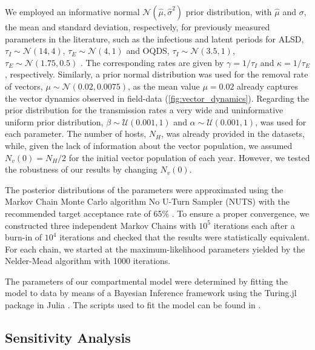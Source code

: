 We employed an informative normal $\mathcal{N}(\hat{\mu},\hat{\sigma}^2)$
prior distribution, with $\hat{\mu}$ and
$\sigma$, the mean and standard deviation, respectively, for previously
measured parameters in the literature, such as the infectious and latent
periods for ALSD, $\tau_I\sim\mathcal{N}(14, 4)$, $\tau_E\sim\mathcal{N}(4, 1)$
\cite{teviotdale2003almond, Moralejo2020} and OQDS,
$\tau_I\sim\mathcal{N}(3.5, 1)$, $\tau_E\sim\mathcal{N}(1.75, 0.5)$
\cite{Fierro2019}. The corresponding rates are given by $\gamma=1/\tau_I$ and
$\kappa=1/\tau_E$, respectively. Similarly, a prior normal distribution was
used for the removal rate of vectors, $\mu\sim\mathcal{N}(0.02, 0.0075)$, as
the mean value $\mu=0.02$ already captures the vector dynamics observed in
field-data (\cref{fig:vector_dynamics}). Regarding the prior distribution for
the transmission rates a very wide and uninformative uniform prior
distribution, $\beta\sim \mathcal{U}(0.001, 1)$ and
$\alpha\sim\mathcal{U}(0.001, 1)$, was used for each parameter. The number of
hosts, $N_H$, was already provided in the datasets, while, given the lack of
information about the vector population, we assumed $N_v(0)=N_H/2$ for the
initial vector population of each year. However, we tested the robustness of
our results by changing $N_v(0)$.

The posterior distributions of the parameters were approximated using the
Markov Chain Monte Carlo algorithm No U-Turn Sampler (NUTS) with the
recommended target acceptance rate of 65\% \cite{Homan2014}. To ensure a
proper convergence, we constructed three independent Markov Chains with $10^5$
iterations each after a burn-in of $10^4$ iterations and checked that the
results were statistically equivalent. For each chain, we started at the
maximum-likelihood parameters yielded by the Nelder-Mead algorithm with 1000
iterations.

The parameters of our compartmental model were determined by fitting the
model to data by means of a Bayesian Inference framework using the Turing.jl
package \cite{Turing.jl} in Julia \cite{julia}. The scripts used to fit the
model can be found in \cite{CODE}.

\subsection{Sensitivity Analysis}

